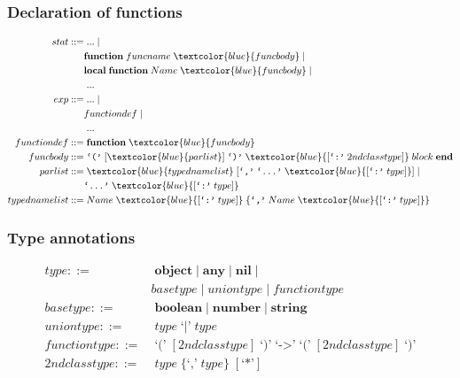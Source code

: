 \documentclass{beamer}
\begin{document}
\begin{frame}
\frametitle{Declaration of functions}
\begin{align*}
stat ::= & \; ... \; |\\
& \textbf{function} \; funcname \; \textcolor{blue}{funcbody} \; |\\
& \textbf{local} \; \textbf{function} \; Name \; \textcolor{blue}{funcbody} \; |\\
& \; ... \\
exp ::= & \; ... \; |\\
& functiondef \; |\\
& \; ...\\
functiondef ::= & \; \textbf{function} \; \textcolor{blue}{funcbody}\\
funcbody ::= & \; \texttt{`('} \; [\textcolor{blue}{parlist}] \; \texttt{`)'} \;
\textcolor{blue}{[\texttt{`:'} \; 2ndclasstype]} \; block \; \textbf{end}\\
parlist ::= & \; \textcolor{blue}{typednamelist} \; [\texttt{`,'} \; \texttt{`...'} \;
\textcolor{blue}{[\texttt{`:'} \; type]}] \; | \;\\
& \texttt{`...'} \; \textcolor{blue}{[\texttt{`:'} \; type]}\\
typednamelist ::= & \; Name \; \textcolor{blue}{[\texttt{`:'} \; type]} \;
\{\texttt{`,'} \; Name \; \textcolor{blue}{[\texttt{`:'} \; type]}\}
\end{align*}
\end{frame}

\begin{frame}
\frametitle{Type annotations}
\begin{align*}
type ::= & \; \textbf{object} \;|\; \textbf{any} \;|\; \textbf{nil} \;|\\
& basetype \;|\; uniontype \;|\; functiontype\\
basetype ::= & \; \textbf{boolean} \;|\; \textbf{number} \;|\; \textbf{string}\\
uniontype ::= & \; type \;\texttt{`|'}\; type\\
functiontype ::= & \; \texttt{`('} \; [2ndclasstype] \; \texttt{`)'} \;
\texttt{`->'} \; \texttt{`('} \; [2ndclasstype] \; \texttt{`)'}\\
2ndclasstype ::= & \; type \; \{\texttt{`,'} \; type\} \; [\texttt{`*'}]
\end{align*}
\end{frame}
\end{document}
